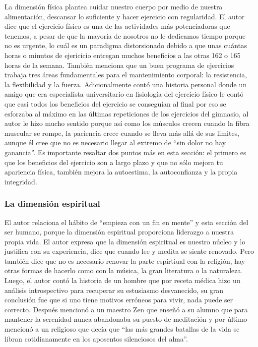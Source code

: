 \documentclass[onecolumn]{article} %
\begin{document}
	La dimensión física plantea cuidar nuestro cuerpo por medio de nuestra alimentación, descansar lo suficiente y hacer ejercicio con regularidad. El autor dice que el ejercicio físico es una de las actividades más potenciadoras que tenemos, a pesar de que la mayoría de nosotros no le dedicamos tiempo porque no es urgente, lo cuál es un paradigma distorsionado debido a que unas cuántas horas o minutos de ejericicio entregan muchos beneficios a las otras 162 o 165 horas de la semana. También menciona que un buen programa de ejercicios trabaja tres áreas fundamentales para el mantenimiento corporal: la resistencia, la flexibilidad y la fuerza. Adicionalmente contó una historia personal donde un amigo que era especialista universitario en fisiología del ejercicio físico le contó que casi todos los beneficios del ejercicio se conseguían al final por eso se esforzaba al máximo en las últimas repeticiones de los ejercicios del gimnasio, al autor le hizo mucho sentido porque así como los músculos crecen cuando la fibra muscular se rompe, la paciencia crece cuando se lleva más allá de sus limites, aunque él cree que no es necesario llegar al extremo de ``sin dolor no hay ganancia''. Es importante resaltar dos puntos más en esta sección: el primero es que los beneficios del ejercicio son a largo plazo y que no sólo mejora tu apariencia física, también mejora la autoestima, la autoconfianza y la propia integridad.
	
	\subsubsection{La dimensión espiritual}
	
	El autor relaciona el hábito de ``empieza con un fin en mente'' y esta sección del ser humano, porque la dimensión espiritual proporciona liderazgo a nuestra propia vida. El autor expresa que la dimensión espiritual es nuestro núcleo y lo justifica con su experiencia, dice que cuando lee y medita se siente renovado. Pero también dice que no es necesario renovar la parte espirtiual con la religión, hay otras formas de hacerlo como con la música, la gran literatura o la naturaleza. Luego, el autor contó la historia de un hombre que por receta médica hizo un análisis introspectivo para recuperar su estusiasmo desvanecido, su gran conclusión fue que si uno tiene motivos erróneos para vivir, nada puede ser correcto. Después mencionó a un maestro Zen que enseñó a su alumno que para mantener la serenidad nunca abandonaba su puesto de meditación y por último mencionó a un religioso que decía que ``las más grandes batallas de la vida se libran cotidianamente en los aposentos silenciosos del alma''.
	
\end{document}

